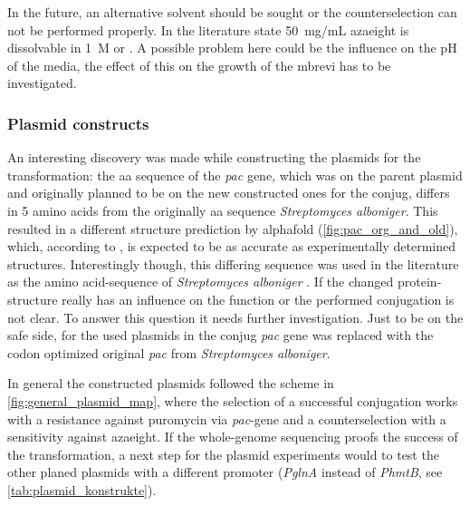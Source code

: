 In the future, an alternative solvent should be sought or the counterselection can not be performed properly. In the literature \textcite{olsonTransformationClostridiumThermocellum2012} state 50~mg/mL \acrshort{azaeight} is dissolvable in 1~M  or . A possible problem here could be the influence on the pH of the media, the effect of this on the growth of the \acrlong{mbrevi} has to be investigated.  






\subsubsection{Plasmid constructs}
\label{sec:plasmid_construction_diskussion}

An interesting discovery was made while constructing the plasmids for the transformation: the \acrlong{aa} sequence of the \textit{pac} gene, which was on the parent plasmid and originally planned to be on the new constructed ones for the \gls{conjug}, differs in 5 amino acids from the originally \acrlong{aa} sequence \textit{Streptomyces alboniger}. This resulted in a different structure prediction by \gls{alphafold} (\cref{fig:pac_org_and_old}), which, according to \textcite{kryshtafovychCriticalAssessmentMethods2021}, is expected to be as accurate as experimentally determined structures. Interestingly though, this differing sequence was used in the literature as the amino acid-sequence of \textit{Streptomyces alboniger} \parencite{lacalleMolecularAnalysisPac1989}.
If the changed protein-structure really has an influence on the function or the performed conjugation is not clear. To answer this question it needs further investigation. 
Just to be on the safe side, for the used plasmids in the \gls{conjug} \textit{pac} gene was replaced with the codon optimized original \textit{pac} from \textit{Streptomyces alboniger}.

In general the constructed plasmids followed the scheme in \cref{fig:general_plasmid_map}, where the selection of a successful conjugation works with a resistance against puromycin via \textit{pac}-gene and a counterselection with a sensitivity against \acrfull{azaeight}. 
If the whole-genome sequencing proofs the success of the transformation, a next step for the plasmid experiments would to test the other planed plasmids with a different promoter (\textit{PglnA} instead of \textit{PhmtB}, see \cref{tab:plasmid_konstrukte}).


